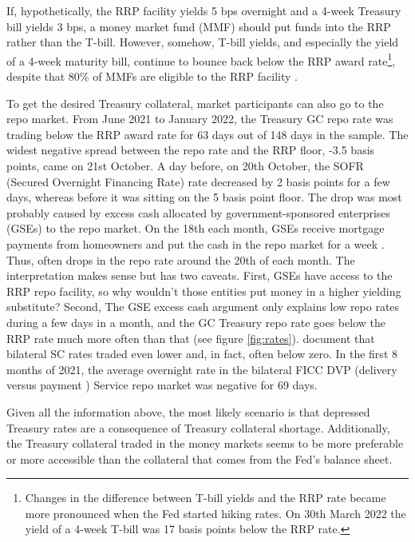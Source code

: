 \documentclass[11pt,a4paper,english,oneside]{article}
\begin{document}
If, hypothetically, the RRP facility yields 5 bps overnight and a 4-week Treasury bill yields 3 bps, a money market fund (MMF) should put funds into the RRP rather than the T-bill. However, somehow, T-bill yields, and especially the yield of a 4-week maturity bill, continue to bounce back below the RRP award rate\footnote{Changes in the difference between T-bill yields and the RRP rate became more pronounced when the Fed started hiking rates. On 30th March 2022 the yield of a 4-week T-bill was 17 basis points below the RRP rate.}, despite that 80\% of MMFs are eligible to the RRP facility \citep{cipriani2022}.

To get the desired Treasury collateral, market participants can also go to the repo market. From June 2021 to January 2022, the Treasury GC repo rate was trading below the RRP award rate for 63 days out of 148 days in the sample. The widest negative spread between the repo rate and the RRP floor, -3.5 basis points, came on 21st October. A day before, on 20th October, the SOFR (Secured Overnight Financing Rate) rate decreased by 2 basis points for a few days, whereas before it was sitting on the 5 basis point floor. The drop was most probably caused by excess cash allocated by government-sponsored enterprises (GSEs) to the repo market. On the 18th each month, GSEs receive mortgage payments from homeowners and put the cash in the repo market for a week \citep{reuters2021}. Thus, often drops in the repo rate around the 20th of each month. The interpretation makes sense but has two caveats. First, GSEs have access to the RRP repo facility, so why wouldn't those entities put money in a higher yielding substitute? Second, The GSE excess cash argument only explains low repo rates during a few days in a month, and the GC Treasury repo rate goes below the RRP rate much more often than that (see figure \ref{fig:rates}). \citet{ofr2021} document that bilateral SC rates traded even lower and, in fact, often below zero. In the first 8 months of 2021, the average overnight rate in the bilateral FICC DVP (delivery versus payment ) Service repo market was negative for 69 days.

Given all the information above, the most likely scenario is that depressed Treasury rates are a consequence of Treasury collateral shortage. Additionally, the Treasury collateral traded in the money markets seems to be more preferable or more accessible than the collateral that comes from the Fed's balance sheet.
\end{document}
